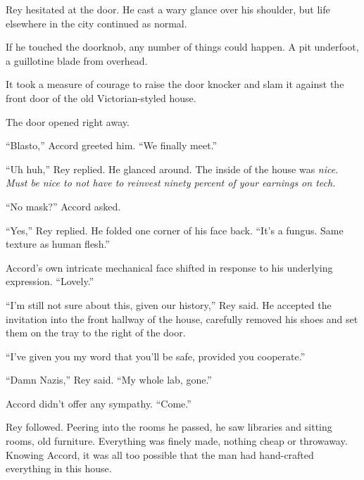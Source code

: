 





Rey hesitated at the door.  He cast a wary glance over his shoulder, but life elsewhere in the city continued as normal.



If he touched the doorknob, any number of things could happen.  A pit underfoot, a guillotine blade from overhead.



It took a measure of courage to raise the door knocker and slam it against the front door of the old Victorian-styled house.



The door opened right away.



``Blasto,'' Accord greeted him.  ``We finally meet.''



``Uh huh,'' Rey replied.  He glanced around.  The inside of the house was \emph{nice}.  \emph{Must be nice to not have to reinvest ninety percent of your earnings on tech.}



``No mask?''  Accord asked.



``Yes,''  Rey replied.  He folded one corner of his face back.  ``It's a fungus.  Same texture as human flesh.''



Accord's own intricate mechanical face shifted in response to his underlying expression.  ``Lovely.''



``I'm still not sure about this, given our history,'' Rey said.  He accepted the invitation into the front hallway of the house, carefully removed his shoes and set them on the tray to the right of the door.



``I've given you my word that you'll be safe, provided you cooperate.''



``Damn Nazis,'' Rey said.  ``My whole lab, gone.''



Accord didn't offer any sympathy.  ``Come.''



Rey followed.  Peering into the rooms he passed, he saw libraries and sitting rooms, old furniture.  Everything was finely made, nothing cheap or throwaway.  Knowing Accord, it was all too possible that the man had hand-crafted everything in this house.



